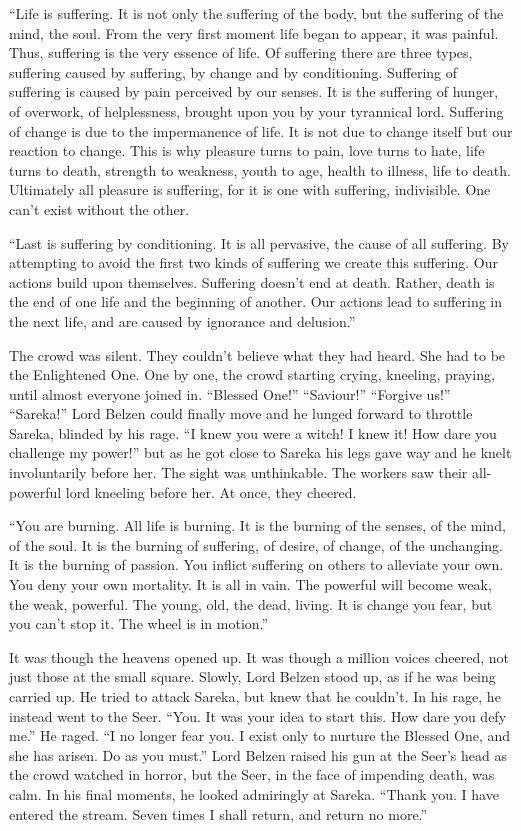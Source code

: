 “Life is suffering. It is not only the suffering of the body, but the suffering of the mind, the soul. From the very first moment life began to appear, it was painful. Thus, suffering is the very essence of life. Of suffering there are three types, suffering caused by suffering, by change and by conditioning. Suffering of suffering is caused by pain perceived by our senses. It is the suffering of hunger, of overwork, of helplessness, brought upon you by your tyrannical lord. Suffering of change is due to the impermanence of life. It is not due to change itself but our reaction to change. This is why pleasure turns to pain, love turns to hate, life turns to death, strength to weakness, youth to age, health to illness, life to death. Ultimately all pleasure is suffering, for it is one with suffering, indivisible. One can’t exist without the other.

“Last is suffering by conditioning. It is all pervasive, the cause of all suffering. By attempting to avoid the first two kinds of suffering we create this suffering. Our actions build upon themselves. Suffering doesn’t end at death. Rather, death is the end of one life and the beginning of another. Our actions lead to suffering in the next life, and are caused by ignorance and delusion.”

The crowd was silent. They couldn’t believe what they had heard. She had to be the Enlightened One. One by one, the crowd starting crying, kneeling, praying, until almost everyone joined in. “Blessed One!” “Saviour!” “Forgive us!” “Sareka!” Lord Belzen could finally move and he lunged forward to throttle Sareka, blinded by his rage. “I knew you were a witch! I knew it! How dare you challenge my power!” but as he got close to Sareka his legs gave way and he knelt involuntarily before her. The sight was unthinkable. The workers saw their all-powerful lord kneeling before her. At once, they cheered.

“You are burning. All life is burning. It is the burning of the senses, of the mind, of the soul. It is the burning of suffering, of desire, of change, of the unchanging. It is the burning of passion. You inflict suffering on others to alleviate your own. You deny your own mortality. It is all in vain. The powerful will become weak, the weak, powerful. The young, old, the dead, living. It is change you fear, but you can’t stop it. The wheel is in motion.”

It was though the heavens opened up. It was though a million voices cheered, not just those at the small square. Slowly, Lord Belzen stood up, as if he was being carried up. He tried to attack Sareka, but knew that he couldn’t. In his rage, he instead went to the Seer. “You. It was your idea to start this. How dare you defy me.” He raged. “I no longer fear you. I exist only to nurture the Blessed One, and she has arisen. Do as you must.” Lord Belzen raised his gun at the Seer’s head as the crowd watched in horror, but the Seer, in the face of impending death, was calm. In his final moments, he looked admiringly at Sareka. “Thank you. I have entered the stream. Seven times I shall return, and return no more.”

